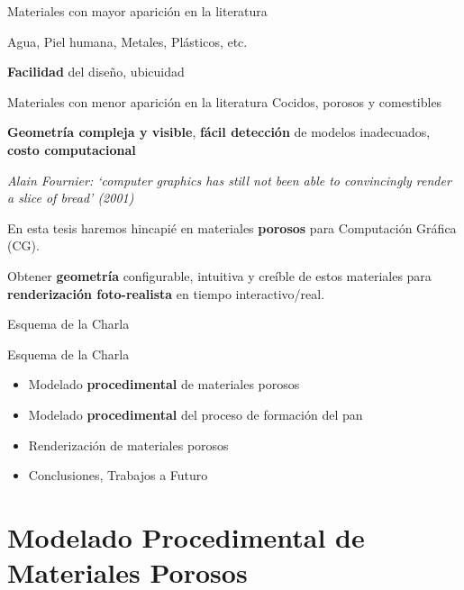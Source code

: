 \documentclass[spanish,unknownkeysallowed,10pt]{beamer}
\begin{document}
\begin{frame}{}

\begin{block}{Materiales con mayor aparición en la literatura}

Agua, Piel humana, Metales, Plásticos, etc. 

\textbf{Facilidad} del diseño, ubicuidad

\end{block}

\begin{block}{Materiales con menor aparición en la literatura}
Cocidos, porosos y comestibles

\textbf{Geometría compleja y visible}, \textbf{fácil detección} de modelos inadecuados, \textbf{costo computacional}


{\it Alain Fournier: `computer graphics has still not been
able to convincingly render a slice of bread' (2001)}
\end{block}


\begin{block}{}
En esta tesis haremos hincapié en materiales \textbf{porosos} para Computación Gráfica (CG).

Obtener \textbf{geometría} configurable, intuitiva y creíble de estos materiales para \textbf{renderización foto-realista} en tiempo interactivo/real.

\end{block}

\end{frame}

\begin{frame}{Esquema de la Charla}

\begin{block}{Esquema de la Charla}
\begin{itemize}
\item Modelado \textbf{procedimental} de materiales porosos
\item Modelado \textbf{procedimental} del proceso de formación del pan
\item Renderización de materiales porosos
\item Conclusiones, Trabajos a Futuro
\end{itemize}
\end{block}

\end{frame}

\section[Mod. de Materiales Porosos]{Modelado Procedimental de Materiales Porosos}
\end{document}
